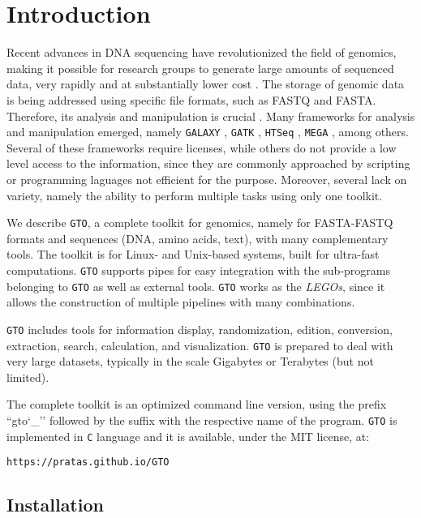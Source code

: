 \chapter{Introduction}
\label{intro}

Recent advances in {DNA} sequencing have revolutionized the field of genomics, making it possible for research groups to generate large amounts of sequenced data, very rapidly and at substantially lower cost \cite{Mardis-2017a}. The storage of genomic data is being addressed using specific file formats, such as FASTQ and FASTA. Therefore, its analysis and manipulation is crucial \cite{Buermans-2014a}. Many frameworks for analysis and manipulation emerged, namely \texttt{GALAXY} \cite{Giardine-2005a}, \texttt{GATK} \cite{DePristo-2011a}, \texttt{HTSeq} \cite{Anders-2014a}, \texttt{MEGA} \cite{Kumar-2016a}, among others. Several of these frameworks require licenses, while others do not provide a low level access to the information, since they are commonly approached
by scripting or programming laguages not efficient for the purpose. Moreover, several lack on variety, namely the ability to perform multiple tasks using only one toolkit.

We describe \texttt{GTO}, a complete toolkit for genomics, namely for FASTA-FASTQ formats and sequences (DNA, amino acids, text), with many complementary tools. The toolkit is for Linux- and Unix-based systems, built for ultra-fast computations. \texttt{GTO} supports pipes for easy integration with the sub-programs belonging to \texttt{GTO} as well as external tools. \texttt{GTO} works as the \textit{LEGOs}, since it allows the construction of multiple pipelines with many combinations.

\texttt{GTO} includes tools for information display, randomization, edition, conversion, extraction, search, calculation, and visualization. \texttt{GTO} is prepared to deal with very large datasets, typically in the scale Gigabytes or Terabytes (but not limited).

The complete toolkit is an optimized command line version, using the prefix ``gto\char`_'' followed by the suffix with the respective name of the program. \texttt{GTO} is implemented in \texttt{C} language and it is available, under the MIT license, at:
\begin{lstlisting}
https://pratas.github.io/GTO
\end{lstlisting}

\section{Installation}

